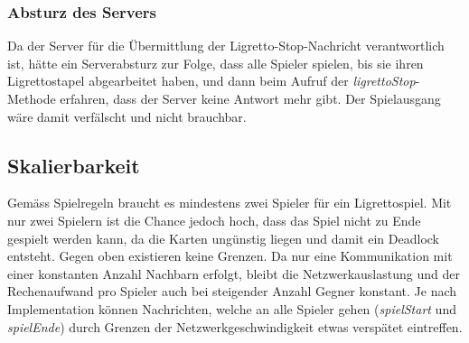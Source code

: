 \subsubsection{Absturz des Servers}
Da der Server für die Übermittlung der Ligretto-Stop-Nachricht verantwortlich ist, hätte ein Serverabsturz zur Folge, dass alle Spieler spielen, bis sie ihren Ligrettostapel abgearbeitet haben, und dann beim Aufruf der \textit{ligrettoStop}-Methode erfahren, dass der Server keine Antwort mehr gibt. Der Spielausgang wäre damit verfälscht und nicht brauchbar.

\subsection{Skalierbarkeit}

Gemäss Spielregeln braucht es mindestens zwei Spieler für ein Ligrettospiel. Mit nur zwei Spielern ist die Chance jedoch hoch, dass das Spiel nicht zu Ende gespielt werden kann, da die Karten ungünstig liegen und damit ein Deadlock entsteht. Gegen oben existieren keine Grenzen. Da nur eine Kommunikation mit einer konstanten Anzahl Nachbarn erfolgt, bleibt die Netzwerkauslastung und der Rechenaufwand pro Spieler auch bei steigender Anzahl Gegner konstant. Je nach Implementation können Nachrichten, welche an alle Spieler gehen (\textit{spielStart} und \textit{spielEnde}) durch Grenzen der Netzwerkgeschwindigkeit etwas verspätet eintreffen.

